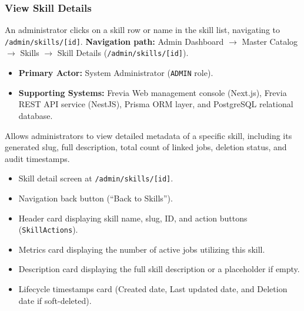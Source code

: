 \subsubsection{ View Skill Details}

An administrator clicks on a skill row or name in the skill list, navigating to \texttt{/admin/skills/[id]}.\newline
\textbf{Navigation path:} Admin Dashboard $\rightarrow$ Master Catalog $\rightarrow$ Skills $\rightarrow$ Skill Details (\texttt{/admin/skills/[id]}).


\begin{itemize}[leftmargin=1.6em,topsep=3pt,itemsep=2pt,parsep=0pt,label=$\bullet$]
    \item \textbf{Primary Actor:} System Administrator (\texttt{ADMIN} role).
    \item \textbf{Supporting Systems:} Frevia Web management console (Next.js), Frevia REST API service (NestJS), Prisma ORM layer, and PostgreSQL relational database.
\end{itemize}

\noindent Allows administrators to view detailed metadata of a specific skill, including its generated slug, full description, total count of linked jobs, deletion status, and audit timestamps.

\begin{itemize}[leftmargin=1.6em,topsep=3pt,itemsep=2pt,parsep=0pt,label=$\bullet$]
    \item Skill detail screen at \texttt{/admin/skills/[id]}.
    \item Navigation back button (``Back to Skills'').
    \item Header card displaying skill name, slug, ID, and action buttons (\texttt{SkillActions}).
    \item Metrics card displaying the number of active jobs utilizing this skill.
    \item Description card displaying the full skill description or a placeholder if empty.
    \item Lifecycle timestamps card (Created date, Last updated date, and Deletion date if soft-deleted).
\end{itemize}

